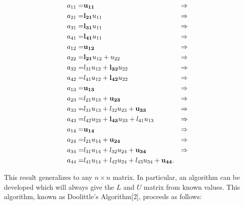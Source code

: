 \documentclass[12pt]{article}
\numberwithin{equation}{section}
\begin{document}
\begin{equation}
\begin{align}
a_{11} =& {\bf u_{11}} &\Rightarrow \\
a_{21} =& {\bf l_{21}} u_{11} &\Rightarrow \\
a_{31} =& {\bf l_{31}}u_{11} &\Rightarrow \\
a_{41} =& {\bf l_{41}}u_{11} &\Rightarrow \\
a_{12} =& {\bf u_{12}} &\Rightarrow \\
a_{22} =& {\bf l_{21}}u_{12}+u_{22} &\Rightarrow \\
a_{32} =& l_{31}u_{12}+{\bf l_{32}}u_{22} &\Rightarrow \\
a_{42} =& l_{41}u_{12}+{\bf l_{42}}u_{22} &\Rightarrow \\
a_{13} =& {\bf u_{13}} &\Rightarrow \\
a_{23} =& l_{21}u_{13}+{\bf u_{23}} &\Rightarrow \\
a_{33} =& l_{31}u_{13}+l_{32}u_{23}+{\bf u_{33}} &\Rightarrow \\
a_{43} =& l_{42}u_{23}+{\bf l_{43}}u_{33}+l_{41}u_{13} &\Rightarrow \\
a_{14} =& {\bf u_{14}} &\Rightarrow \\
a_{24} =& l_{21}u_{14}+{\bf u_{24}} &\Rightarrow \\
a_{34} =& l_{31}u_{14}+l_{32}u_{24}+{\bf u_{34}} &\Rightarrow \\
a_{44} =& l_{41}u_{14}+l_{42}u_{24}+l_{43}u_{34}+{\bf u_{44}}. &
\end{align}
\end{equation}
\vspace{.2cm}

\noindent This result generalizes to any $n\times n$ matrix.  In particular, an algorithm can be developed which will always give the $L$ and $U$ matrix from known values.  This algorithm, known as Doolittle's Algorithm[2], proceeds as follows:
\end{document}
